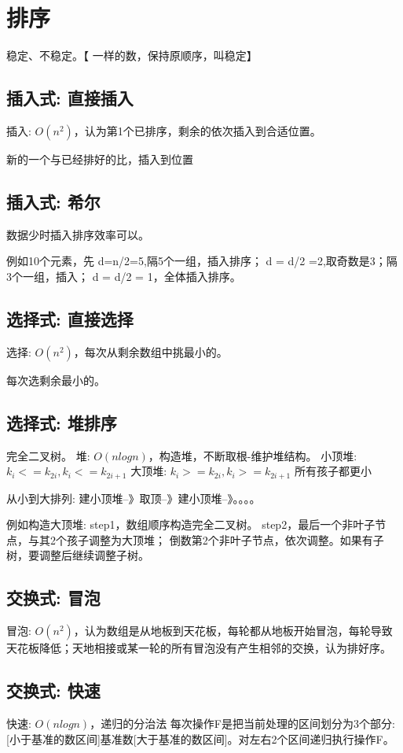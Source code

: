 \documentclass[UTF8]{../computerUniverse}
\begin{document}
\section{排序}

稳定、不稳定。【 一样的数，保持原顺序，叫稳定】



\subsection{插入式: 直接插入}
插入: $O(n^2)$，认为第1个已排序，剩余的依次插入到合适位置。

新的一个与已经排好的比，插入到位置


\subsection{插入式: 希尔}
数据少时插入排序效率可以。

例如10个元素，先
d=n/2=5,隔5个一组，插入排序；
d = d/2  =2,取奇数是3；隔3个一组，插入；
d = d/2 = 1，全体插入排序。


\subsection{选择式: 直接选择}
选择: $O(n^2)$，每次从剩余数组中挑最小的。

每次选剩余最小的。


\subsection{选择式: 堆排序}
完全二叉树。
堆: $O(nlogn)$，构造堆，不断取根-维护堆结构。
小顶堆: $k_i<=k_{2i}, k_i<=k_{2i+1}$
大顶堆: $k_i>=k_{2i}, k_i>=k_{2i+1}$ 所有孩子都更小

从小到大排列: 建小顶堆--》取顶--》建小顶堆--》。。。。

例如构造大顶堆: 
step1，数组顺序构造完全二叉树。
step2，最后一个非叶子节点，与其2个孩子调整为大顶堆；
       倒数第2个非叶子节点，依次调整。如果有子树，要调整后继续调整子树。
       

\subsection{交换式: 冒泡}
冒泡: $O(n^2)$，认为数组是从地板到天花板，每轮都从地板开始冒泡，每轮导致天花板降低；天地相接或某一轮的所有冒泡没有产生相邻的交换，认为排好序。


\subsection{交换式: 快速}    
快速: $O(nlogn)$，递归的分治法
每次操作F是把当前处理的区间划分为3个部分: [小于基准的数区间]基准数[大于基准的数区间]。对左右2个区间递归执行操作F。
\end{document}
